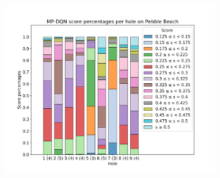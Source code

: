 \documentclass{kththesis}
\begin{document}
\begin{figure}
{\begin{subfigure}{0.3\paperwidth}
    \end{subfigure}
    \begin{subfigure}{0.3\paperwidth}
    \centering
    \includegraphics[width=0.3\paperwidth]{AgentPercentages/MPDQN_Score_Percentages_Pebble.png} 
    \end{subfigure}
    }
\end{figure}
\end{document}
